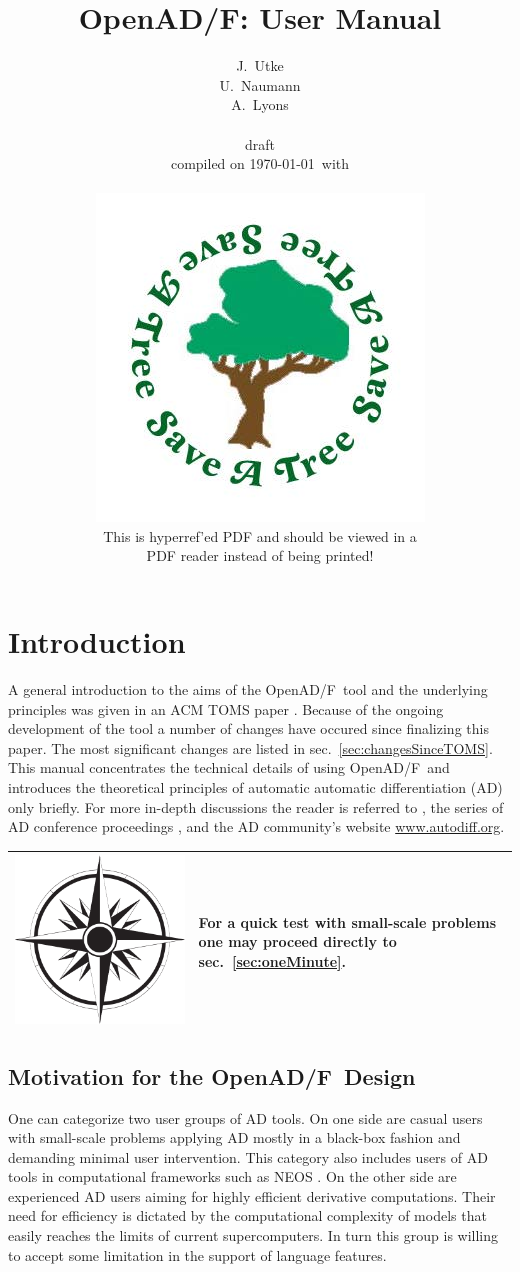 \documentclass{book}
\title{OpenAD/F: User Manual}
\author{J.~Utke  \\
	U.~Naumann \\
	A.~Lyons \\\\
\scriptsize draft  \\
\scriptsize compiled on \today\ with \\
\framebox{
\begin{minipage}{6.5cm}
\tiny

\end{minipage}
}
\vspace{4cm}
\\
\includegraphics[width=.2\textwidth]{savetree.jpg}\\[1ex]
\Large This is hyperref'ed PDF and should be viewed in a \\[.5ex]
\Large PDF reader instead of being printed!
}
\date{ }
\newcommand{\OpenADF}{OpenAD/F}
\newcommand{\refsec}[1]{{sec.~\ref{#1}}}
\newcommand{\nav}[1]{
\begin{tabular}{|m{.03\textwidth}|m{.92\textwidth}|}\hline
\vspace{1mm}
\includegraphics[width=.03\textwidth]{windrose_zh1}&
\vspace{1mm}
\begin{minipage}[c]{.86\textwidth}
\small {#1}
\end{minipage}
\vspace{1mm}
\\\hline
\end{tabular}
}
\begin{document}
\maketitle
\tableofcontents
\listoffigures
\listoftables

\pagestyle{fancy}
\lstset{basicstyle=\small\tt, 
	numbers=left, 
	numberstyle=\scriptsize,
  	stepnumber=1, 
	numbersep=10pt, 
	breaklines=true,
	resetmargins=false,
	xleftmargin=6ex,
	columns=fullflexible}
\chapter{Introduction} \label{sec:Introduction}

A general introduction to the aims of the \OpenADF\ tool and the underlying principles 
was given in an ACM TOMS paper \cite{Utke2008OAM}. 
Because of the ongoing development of the tool a number of changes have occured 
since finalizing this paper. The most significant changes are listed in \refsec{sec:changesSinceTOMS}.
This manual concentrates the technical details of using \OpenADF\ and introduces the 
theoretical principles of automatic automatic differentiation (AD) only 
briefly. For more in-depth discussions the reader is referred to 
\cite{Griewank2008EDP}, the series of AD conference proceedings 
\cite{Griewank1991ADo,Berz1996CDT,Corliss2002ADo,Bucker2005ADA,Bischof2008AiA},
and the AD community's website \url{www.autodiff.org}. \\
\nav{For a quick test with small-scale problems one may proceed directly to \refsec{sec:oneMinute}.} 

\section{Motivation for the \OpenADF\ Design}


One can categorize two user groups of AD tools. 
On one side are casual users 
with small-scale problems applying AD mostly in a black-box fashion 
and demanding minimal user intervention. 
This category also includes users of AD tools in  computational 
frameworks such as NEOS \cite{neosWeb}.
On the other side are experienced AD users aiming for highly efficient 
derivative computations.
Their need for efficiency is dictated by the 
computational complexity of models that easily reaches the limits of  current 
supercomputers. 
In turn this group is willing to accept some limitation in the support of 
language features.
\end{document}
